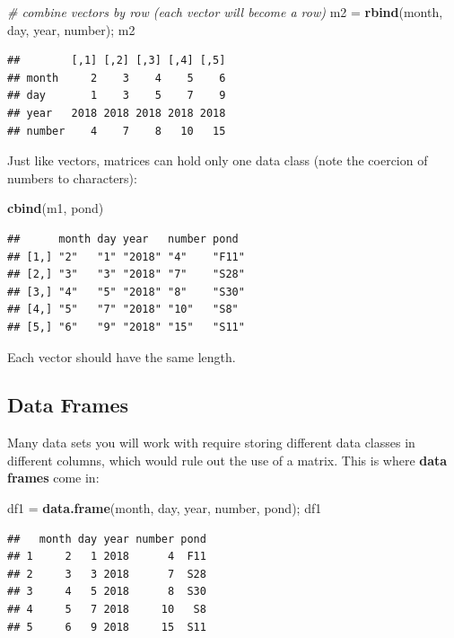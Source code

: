 \documentclass[]{book}
\newenvironment{Shaded}{\begin{snugshade}}{\end{snugshade}}
\newcommand{\KeywordTok}[1]{\textcolor[rgb]{0.13,0.29,0.53}{\textbf{#1}}}
\newcommand{\StringTok}[1]{\textcolor[rgb]{0.31,0.60,0.02}{#1}}
\newcommand{\CommentTok}[1]{\textcolor[rgb]{0.56,0.35,0.01}{\textit{#1}}}
\newcommand{\NormalTok}[1]{#1}
\theoremstyle{definition}
\theoremstyle{definition}
\theoremstyle{definition}
\theoremstyle{remark}
\begin{document}
\begin{Shaded}
\begin{Highlighting}[]
\CommentTok{# combine vectors by row (each vector will become a row)}
\NormalTok{m2 =}\StringTok{ }\KeywordTok{rbind}\NormalTok{(month, day, year, number); m2}
\end{Highlighting}
\end{Shaded}

\begin{verbatim}
##        [,1] [,2] [,3] [,4] [,5]
## month     2    3    4    5    6
## day       1    3    5    7    9
## year   2018 2018 2018 2018 2018
## number    4    7    8   10   15
\end{verbatim}

Just like vectors, matrices can hold only one data class (note the
coercion of numbers to characters):

\begin{Shaded}
\begin{Highlighting}[]
\KeywordTok{cbind}\NormalTok{(m1, pond)}
\end{Highlighting}
\end{Shaded}

\begin{verbatim}
##      month day year   number pond 
## [1,] "2"   "1" "2018" "4"    "F11"
## [2,] "3"   "3" "2018" "7"    "S28"
## [3,] "4"   "5" "2018" "8"    "S30"
## [4,] "5"   "7" "2018" "10"   "S8" 
## [5,] "6"   "9" "2018" "15"   "S11"
\end{verbatim}

Each vector should have the same length.

\subsection{Data Frames}\label{data-frames}

Many data sets you will work with require storing different data classes
in different columns, which would rule out the use of a matrix. This is
where \textbf{data frames} come in:

\begin{Shaded}
\begin{Highlighting}[]
\NormalTok{df1 =}\StringTok{ }\KeywordTok{data.frame}\NormalTok{(month, day, year, number, pond); df1}
\end{Highlighting}
\end{Shaded}

\begin{verbatim}
##   month day year number pond
## 1     2   1 2018      4  F11
## 2     3   3 2018      7  S28
## 3     4   5 2018      8  S30
## 4     5   7 2018     10   S8
## 5     6   9 2018     15  S11
\end{verbatim}
\end{document}
